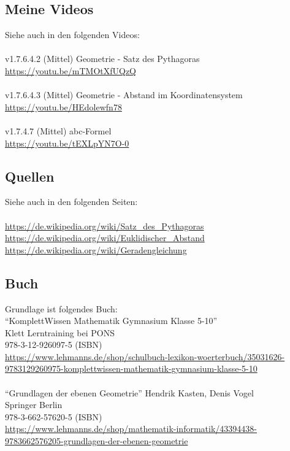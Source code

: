 \documentclass[a4paper]{amsart}
\theoremstyle{definition}
\begin{document}
\subsection*{Meine Videos}
Siehe auch in den folgenden Videos:\\
\\
v1.7.6.4.2 (Mittel) Geometrie - Satz des Pythagoras\\
\url{https://youtu.be/mTMOtXfUQzQ}\\
\\
v1.7.6.4.3 (Mittel) Geometrie - Abstand im Koordinatensystem\\
\url{https://youtu.be/HEdolewfn78}\\
\\
v1.7.4.7 (Mittel) abc-Formel\\
\url{https://youtu.be/tEXLpYN7O-0}

\subsection*{Quellen}
Siehe auch in den folgenden Seiten:\\
\\
\url{https://de.wikipedia.org/wiki/Satz_des_Pythagoras}\\
\url{https://de.wikipedia.org/wiki/Euklidischer_Abstand}\\
\url{https://de.wikipedia.org/wiki/Geradengleichung}

\subsection*{Buch}
Grundlage ist folgendes Buch:\\

"`KomplettWissen Mathematik Gymnasium Klasse 5-10"'\\
Klett Lerntraining bei PONS\\
978-3-12-926097-5 (ISBN)\\
{\tiny
   \url{https://www.lehmanns.de/shop/schulbuch-lexikon-woerterbuch/35031626-9783129260975-komplettwissen-mathematik-gymnasium-klasse-5-10
   }
}\\
\\
"`Grundlagen der ebenen Geometrie"'
Hendrik Kasten, Denis Vogel\\
Springer Berlin\\
978-3-662-57620-5 (ISBN)\\
{\tiny
   \url{
      https://www.lehmanns.de/shop/mathematik-informatik/43394438-9783662576205-grundlagen-der-ebenen-geometrie
   }
}
\end{document}
